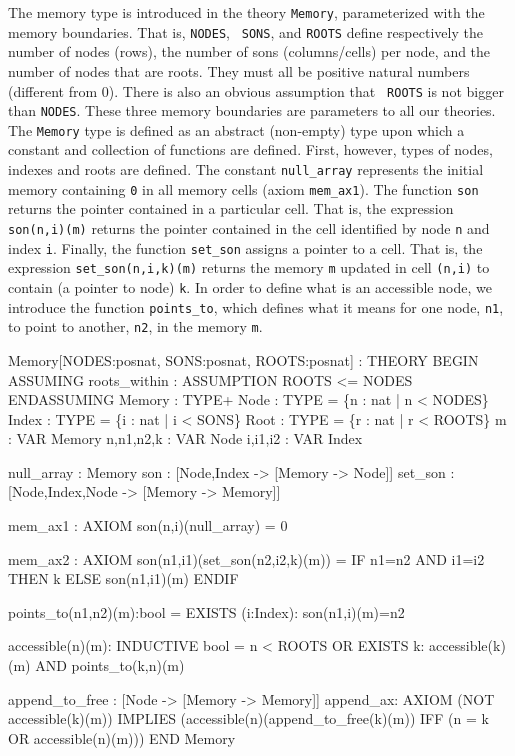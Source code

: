 The    memory  type is     introduced  in  the   theory {\tt  Memory},
parameterized with the memory boundaries.   That is, {\tt NODES}, {\tt
  SONS}, and {\tt  ROOTS}   define respectively  the  number of  nodes
(rows), the number of sons (columns/cells) per node, and the number of
nodes that are   roots.  They must  all  be  positive natural  numbers
(different from $0$)\@.  There is also an obvious assumption that {\tt
  ROOTS}  is  not bigger  than   {\tt  NODES}\@.  These three   memory
boundaries are parameters to all our  theories.  The {\tt Memory} type
is defined as an abstract  (non-empty) type upon  which a constant and
collection of functions are  defined.  First, however, types of nodes,
indexes and roots are defined.
The   constant  {\tt   null\_array} represents    the initial   memory
containing {\tt 0} in all memory cells (axiom  {\tt mem\_ax1})\@.  The
function {\tt son} returns the pointer contained in a particular cell.
That is,   the   expression {\tt  son(n,i)(m)}  returns  the   pointer
contained in the cell identified by node {\tt n} and  index {\tt i}\@. 
Finally,  the function {\tt  set\_son}  assigns a  pointer to a  cell. 
That is, the  expression  {\tt set\_son(n,i,k)(m)} returns the  memory
{\tt m} updated in  cell {\tt (n,i)} to   contain (a pointer to  node)
{\tt  k}\@.   
In  order to  define   what is  an   accessible node, we
introduce the function  {\tt points\_to}, which  defines what it means
for one node, {\tt n1},  to point to another, {\tt  n2}, in the memory
{\tt m}\@. 

\begin{smallsession}
Memory[NODES:posnat, SONS:posnat, ROOTS:posnat] : THEORY
BEGIN
  ASSUMING roots_within : ASSUMPTION ROOTS <= NODES ENDASSUMING
  Memory : TYPE+
  Node   : TYPE = \{n : nat | n < NODES\}
  Index  : TYPE = \{i : nat | i < SONS\}
  Root   : TYPE = \{r : nat | r < ROOTS\}
  m         : VAR Memory
  n,n1,n2,k : VAR Node
  i,i1,i2   : VAR Index

  null_array : Memory
  son        : [Node,Index -> [Memory -> Node]]
  set_son    : [Node,Index,Node -> [Memory -> Memory]]

  mem_ax1 : AXIOM son(n,i)(null_array) = 0

  mem_ax2 : AXIOM son(n1,i1)(set_son(n2,i2,k)(m)) =
                    IF n1=n2 AND i1=i2 THEN k ELSE son(n1,i1)(m) ENDIF

  points_to(n1,n2)(m):bool = EXISTS (i:Index): son(n1,i)(m)=n2

  accessible(n)(m): INDUCTIVE bool = 
    n < ROOTS OR
    EXISTS k: accessible(k)(m) AND points_to(k,n)(m)

  append_to_free : [Node -> [Memory -> Memory]]
  append_ax: AXIOM (NOT accessible(k)(m)) IMPLIES
                      (accessible(n)(append_to_free(k)(m)) 
                       IFF (n = k OR accessible(n)(m)))  
END Memory
\end{smallsession}
\label{memory-fig}

